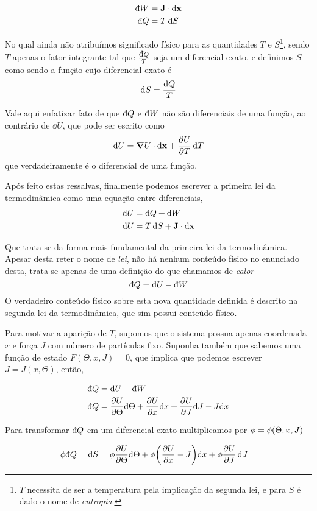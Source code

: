 \documentclass[twoside]{amsart}
\newcommand{\dbar}{\mbox{\dj}}
\numberwithin{equation}{section}
\begin{document}
\begin{refsection}
\begin{align}
    \dbar W&=\vb J\cdot\dd{\vb x}\\
    \dbar Q&=T\dd{S}
\end{align}

No qual ainda não atribuímos significado físico para as quantidades $T$ e $S$\footnote{$T$ necessita de ser a temperatura pela implicação da segunda lei, e para $S$ é dado o nome de \emph{entropia}.}, sendo $T$ apenas o fator integrante tal que 
$\frac{\dbar Q}{T}$ seja um diferencial exato, e definimos $S$ como sendo a função cujo diferencial exato é $$\dd{S}=\frac{\dbar Q}{T}$$

Vale aqui enfatizar fato de que $\dbar Q$ e $\dbar W$ não são diferenciais de uma função, ao contrário de $\dd{U}$, que 
pode ser escrito como $$\dd{U}=\grad{U}\cdot\dd\vb x+\pdv{U}{T}\dd{T}$$ que verdadeiramente é o diferencial de uma função.

Após feito estas ressalvas, finalmente podemos escrever a primeira lei da termodinâmica como uma equação entre diferenciais,
\begin{align}
    \dd{U}&=\dbar Q+\dbar W\\
    \dd{U}&=T\dd{S}+\vb J\cdot \dd{\vb x}
\end{align}

Que trata-se da forma mais fundamental da primeira lei da termodinâmica. Apesar desta reter o nome de \emph{lei}, não há nenhum 
conteúdo físico no enunciado desta, trata-se apenas de uma definição do que chamamos de \emph{calor} $$\dbar Q=\dd{U}-\dbar W$$ O 
verdadeiro conteúdo físico sobre esta nova quantidade definida é descrito na segunda lei da termodinâmica, que sim possui conteúdo 
físico.

Para motivar a aparição de $T$, supomos que o sistema possua apenas coordenada $x$ e força $J$ com número de partículas fixo. 
Suponha também que sabemos uma função de estado $F(\Theta,x,J)=0$, que implica que podemos escrever $J=J(x,\Theta)$, então,

\begin{align}
    \dbar Q&=\dd{U}-\dbar W\\
    \dbar Q&=\pdv{U}{\Theta}\dd\Theta+\pdv{U}{x}\dd x+\pdv{U}{J}\dd J-J\dd x
\end{align}

Para transformar $\dbar Q$ em um diferencial exato multiplicamos por $\phi=\phi\qty(\Theta,x,J)$

\begin{align}
    \phi\dbar Q=\dd S&=\phi\pdv{U}{\Theta}\dd\Theta+\phi\qty(\pdv{U}{x}-J)\dd x+\phi\pdv{U}{J}\dd{J}
\end{align}


\end{refsection}
\end{document}
